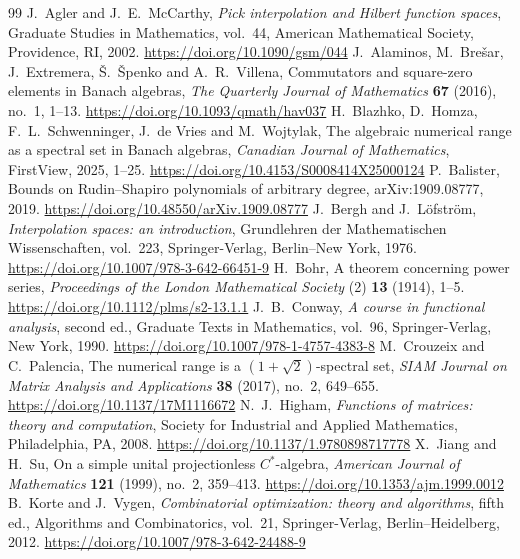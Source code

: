 \documentclass[10pt,a4paper]{amsart}
\begin{document}
\begin{thebibliography}{99}
 J.~Agler and J.~E.~McCarthy, \emph{Pick interpolation and Hilbert function spaces}, Graduate Studies in Mathematics, vol.~44, American Mathematical Society, Providence, RI, 2002. \url{https://doi.org/10.1090/gsm/044}
 J.~Alaminos, M.~Bre\v{s}ar, J.~Extremera, \v{S}.~\v{S}penko and A.~R.~Villena, Commutators and square-zero elements in Banach algebras, \emph{The Quarterly Journal of Mathematics} \textbf{67} (2016), no.~1, 1--13. \url{https://doi.org/10.1093/qmath/hav037}
 H.~Blazhko, D.~Homza, F.~L.~Schwenninger, J.~de Vries and M.~Wojtylak, The algebraic numerical range as a spectral set in Banach algebras, \emph{Canadian Journal of Mathematics}, FirstView, 2025, 1--25. \url{https://doi.org/10.4153/S0008414X25000124}
 P.~Balister, Bounds on Rudin--Shapiro polynomials of arbitrary degree, arXiv:1909.08777, 2019. \url{https://doi.org/10.48550/arXiv.1909.08777}
 J.~Bergh and J.~L\"ofstr\"om, \emph{Interpolation spaces: an introduction}, Grundlehren der Mathematischen Wissenschaften, vol.~223, Springer-Verlag, Berlin--New York, 1976. \url{https://doi.org/10.1007/978-3-642-66451-9}
 H.~Bohr, A theorem concerning power series, \emph{Proceedings of the London Mathematical Society} (2) \textbf{13} (1914), 1--5. \url{https://doi.org/10.1112/plms/s2-13.1.1}
 J.~B.~Conway, \emph{A course in functional analysis}, second ed., Graduate Texts in Mathematics, vol.~96, Springer-Verlag, New York, 1990. \url{https://doi.org/10.1007/978-1-4757-4383-8}
 M.~Crouzeix and C.~Palencia, The numerical range is a \((1+\sqrt2)\)-spectral set, \emph{SIAM Journal on Matrix Analysis and Applications} \textbf{38} (2017), no.~2, 649--655. \url{https://doi.org/10.1137/17M1116672}
 N.~J.~Higham, \emph{Functions of matrices: theory and computation}, Society for Industrial and Applied Mathematics, Philadelphia, PA, 2008. \url{https://doi.org/10.1137/1.9780898717778}
 X.~Jiang and H.~Su, On a simple unital projectionless \(C^*\)-algebra, \emph{American Journal of Mathematics} \textbf{121} (1999), no.~2, 359--413. \url{https://doi.org/10.1353/ajm.1999.0012}
 B.~Korte and J.~Vygen, \emph{Combinatorial optimization: theory and algorithms}, fifth ed., Algorithms and Combinatorics, vol.~21, Springer-Verlag, Berlin--Heidelberg, 2012. \url{https://doi.org/10.1007/978-3-642-24488-9}

\end{thebibliography}
\end{document}
